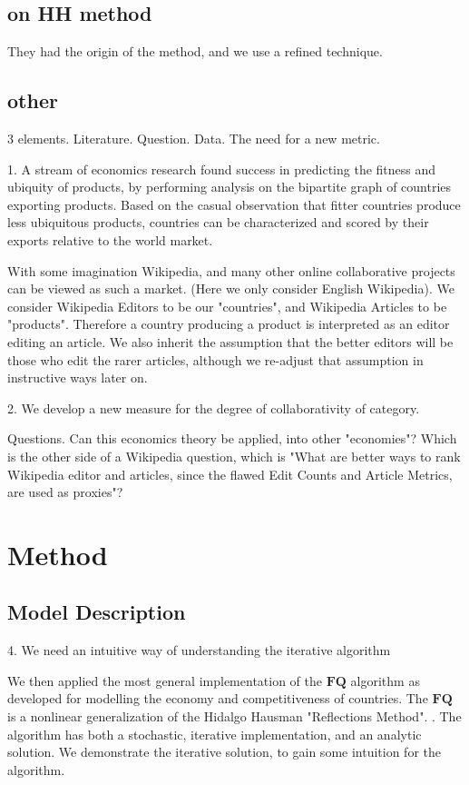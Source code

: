 \documentclass{acm_proc_article-sp}
\begin{document}
\subsection{ on HH method}
They had the origin of the method, and we use a refined technique.

\subsection{other}


3 elements. Literature. Question. Data. The need for a new metric.

1. A stream of economics research found success in predicting the fitness and ubiquity of products, by performing analysis on the bipartite graph of countries exporting products. Based on the casual observation that fitter countries produce less ubiquitous products, countries can be characterized and scored by their exports relative to the world market.

With some imagination Wikipedia, and many other online collaborative projects can be viewed as such a market. (Here we only consider English Wikipedia). We consider Wikipedia Editors to be our "countries", and Wikipedia Articles to be "products". Therefore a country producing a product is interpreted as an editor editing an article. We also inherit the assumption that the better editors will be those who edit the rarer articles, although we re-adjust that assumption in instructive ways later on. 


2. We develop a new measure for the degree of collaborativity of category.

Questions. Can this economics theory be applied, into other "economies"? Which is the other side of a Wikipedia question, which is "What are better ways to rank Wikipedia editor and articles, since the flawed Edit Counts and Article Metrics, are used as proxies"?



 

\section{Method}

\subsection{Model Description}
4. We need an intuitive way of understanding the iterative algorithm

We then applied the most general implementation of the $\mathbf{FQ}$ algorithm as developed for modelling the economy and competitiveness of countries. The $\mathbf{FQ}$ is a nonlinear generalization of the Hidalgo Hausman "Reflections Method". \cite{Caldarelli}. The algorithm has both a stochastic, iterative implementation, and an analytic solution. We demonstrate the iterative solution, to gain some intuition for the algorithm.
\end{document}
